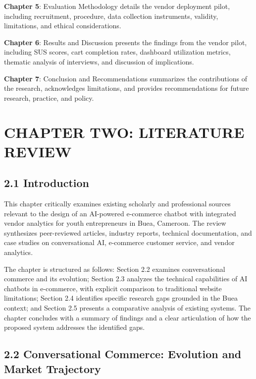 \documentclass[12pt,a4paper]{article}
\begin{document}
\textbf{Chapter 5}: Evaluation Methodology details the vendor deployment pilot, including recruitment, procedure, data collection instruments, validity, limitations, and ethical considerations.

\textbf{Chapter 6}: Results and Discussion presents the findings from the vendor pilot, including SUS scores, cart completion rates, dashboard utilization metrics, thematic analysis of interviews, and discussion of implications.

\textbf{Chapter 7}: Conclusion and Recommendations summarizes the contributions of the research, acknowledges limitations, and provides recommendations for future research, practice, and policy.

\newpage

\section{CHAPTER TWO: LITERATURE REVIEW}

\subsection{2.1 Introduction}

This chapter critically examines existing scholarly and professional sources relevant to the design of an AI-powered e-commerce chatbot with integrated vendor analytics for youth entrepreneurs in Buea, Cameroon. The review synthesizes peer-reviewed articles, industry reports, technical documentation, and case studies on conversational AI, e-commerce customer service, and vendor analytics.

The chapter is structured as follows: Section 2.2 examines conversational commerce and its evolution; Section 2.3 analyzes the technical capabilities of AI chatbots in e-commerce, with explicit comparison to traditional website limitations; Section 2.4 identifies specific research gaps grounded in the Buea context; and Section 2.5 presents a comparative analysis of existing systems. The chapter concludes with a summary of findings and a clear articulation of how the proposed system addresses the identified gaps.

\subsection{2.2 Conversational Commerce: Evolution and Market Trajectory}
\end{document}
